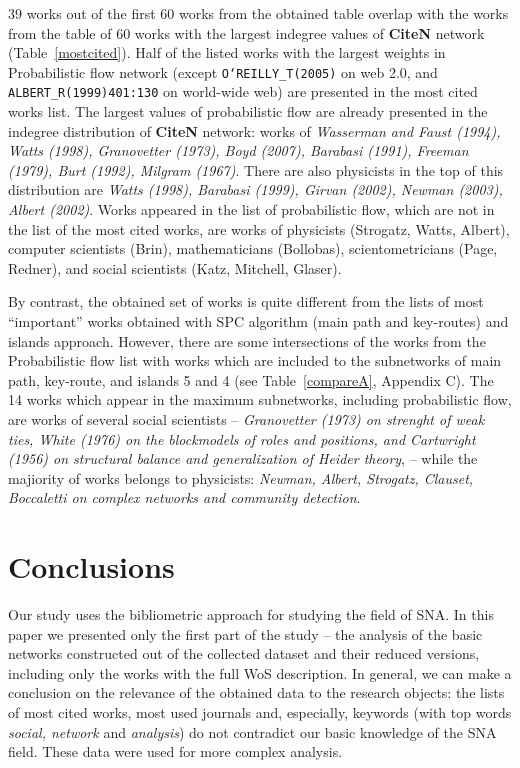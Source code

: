 \documentclass[11pt]{article} %
\begin{document}
39 works out of the first 60 works from the obtained table overlap with the works from the table of 60 works with the largest indegree values of \textbf{CiteN} network (Table~\ref{mostcited}). Half of the listed works with the largest weights in Probabilistic flow network (except \texttt{O`REILLY\_T(2005)} on web 2.0, and \texttt{ALBERT\_R(1999)401:130} on world-wide web) are presented in the most cited works list. The largest values of probabilistic flow are already presented in the indegree distribution of \textbf{CiteN} network: works of \textit{Wasserman and Faust (1994), Watts (1998), Granovetter (1973), Boyd (2007), Barabasi (1991), Freeman (1979), Burt (1992), Milgram (1967)}. There are also physicists in the top of this distribution are \textit{Watts (1998), Barabasi (1999), Girvan (2002), Newman (2003), Albert (2002)}. Works appeared in the list of probabilistic flow, which are not in the list of the most cited works, are works of physicists (Strogatz, Watts, Albert), computer scientists (Brin), mathematicians (Bollobas), scientometricians (Page, Redner), and social scientists (Katz, Mitchell, Glaser).  

By contrast, the obtained set of works is quite different from the lists of most ``important'' works obtained with SPC algorithm (main path and key-routes) and islands approach. However, there are some intersections of the works from the Probabilistic flow list with works which are included to the subnetworks of main path, key-route, and islands 5 and 4 (see Table~\ref{compareA}, Appendix C). The 14 works which appear in the maximum subnetworks, including probabilistic flow, are works of several social scientists -- \textit{Granovetter (1973) on strenght of weak ties, White (1976) on  the blockmodels of roles and positions, and Cartwright (1956) on structural balance and generalization of Heider theory}, -- while the majiority of works belongs to physicists: \textit{Newman, Albert, Strogatz, Clauset, Boccaletti on complex networks and community detection}.  
 
\section{Conclusions}

Our study uses the bibliometric approach for studying the field of SNA. In this paper we presented only the first part of the study --  the analysis of the basic networks constructed out of the collected dataset and their reduced versions, including only the works with the full WoS description. In general, we can make a conclusion on the relevance of the obtained data to the research objects: the lists of most cited works, most used journals and, especially, keywords (with top words \textit{social, network} and \textit{analysis}) do not contradict our basic knowledge of the SNA field. These data were used for more complex analysis. \medskip 
\end{document}
